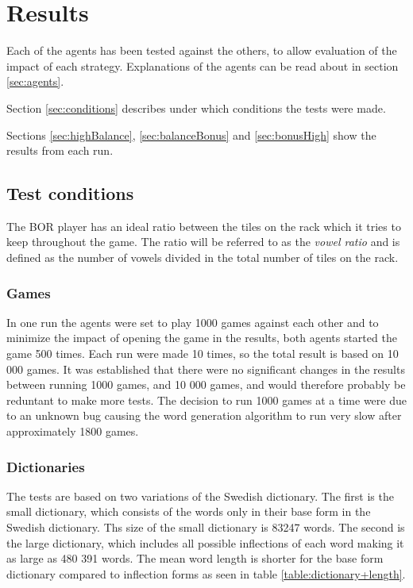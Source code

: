 \documentclass[a4paper, 12pt]{report}
\begin{document}
\chapter{Results}
\label{sec:analysis}
Each of the agents has been tested against the others, to allow evaluation of the impact of each strategy. Explanations of the agents can be read about in section \ref{sec:agents}. 

Section \ref{sec:conditions} describes under which conditions the tests were made.

Sections \ref{sec:highBalance}, \ref{sec:balanceBonus} and \ref{sec:bonusHigh} show the results from each run.
 
\section{Test conditions}
The BOR player has an ideal ratio between the tiles on the rack which it tries to keep throughout the game. The ratio will be referred to as the \emph{vowel ratio} and is defined as the number of vowels divided in the total number of tiles on the rack.

\label{sec:conditions}
\subsection{Games}
In one run the agents were set to play 1000 games against each other and to minimize the impact of opening the game in the results, both agents started the game 500 times. Each run were made 10 times, so the total result is based on 10 000 games. It was established that there were no significant changes in the results between running 1000 games, and 10 000 games, and would therefore probably be reduntant to make more tests. The decision to run 1000 games at a time were due to an unknown bug causing the word generation algorithm to run very slow after approximately 1800 games.

\subsection{Dictionaries}

The tests are based on two variations of the Swedish dictionary. The first is the small dictionary, which consists of the words only in their base form in the Swedish dictionary. Ths size of the small dictionary is 83247 words. The second is the large dictionary, which includes all possible inflections of each word making it as large as 480 391 words. The mean word length is shorter for the base form dictionary compared to inflection forms as seen in table \ref{table:dictionary+length}.
\end{document}
